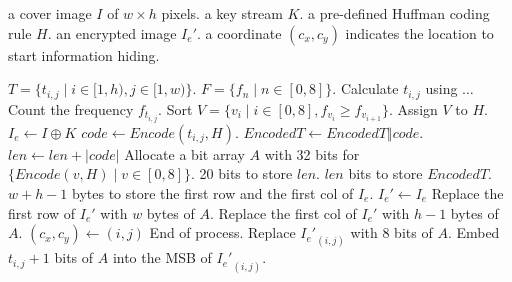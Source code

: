 \begin{algorithm}
	\caption{The content owner generates an encrypted image}
	
	\begin{algorithmic}[1]
		\Require a cover image $I$ of $w \times h$ pixels.
		\Require a key stream $K$.
		\Require a pre-defined Huffman coding rule $H$.
		\Ensure an encrypted image $I_e\prime$.
		\Ensure a coordinate $(c_x, c_y)$ indicates the location to start information hiding.
		
		\State $T = \{t_{i, j} \mid i \in [1, h), j \in [1, w)\}$. 
		\State $F = \{f_n \mid n \in [0, 8]\}$. 
		\ForAll{$\{x_{i, j} \mid x_{i, j} \in I, i \in [1, h), j \in [1, w)\}$}
			\State Calculate $t_{i, j}$ using $\dots$
			\State Count the frequency $f_{t_{i, j}}$.
		\EndFor
		\State Sort $V = \{v_i \mid i \in [0, 8], f_{v_i} \geq f_{v_{i + 1}} \}$.
		\State Assign $V$ to $H$.
		\State $I_e \gets I \oplus K$
				\State $code \gets Encode(t_{i, j}, H)$.
				\State $EncodedT \gets EncodedT \Vert code$.
				\State $len \gets len + \left \vert code \right \vert$
			\EndFor
		\EndFor
		\State Allocate a bit array $A$ with
			\State\hspace{\algorithmicindent} 32 bits for $\{Encode(v, H) \mid v \in [0, 8] \}$.
			\State\hspace{\algorithmicindent} 20 bits to store $len$.
			\State\hspace{\algorithmicindent} $len$ bits to store $EncodedT$.
			\State\hspace{\algorithmicindent} $w + h - 1$ bytes to store the first row and the first col of $I_e$.
		\State $I_e\prime \gets I_e$
		\State Replace the first row of $I_e\prime$ with $w$ bytes of $A$.
		\State Replace the first col of $I_e\prime$ with $h - 1$ bytes of $A$.
		\ForAll{$\{t_{i, j} \mid t_{i, j} \in T, i \in [1, h), j \in [1, w)\}$}
				\State $(c_x, c_y) \gets (i, j)$
				\State End of process.
				\State Replace ${I_e\prime}_{(i, j)}$ with 8 bits of $A$.
			\Else
				\State Embed $t_{i, j} + 1$ bits of $A$ into the MSB of ${I_e\prime}_{(i, j)}$.
			\EndIf
		\EndFor
	\end{algorithmic}
\end{algorithm}


